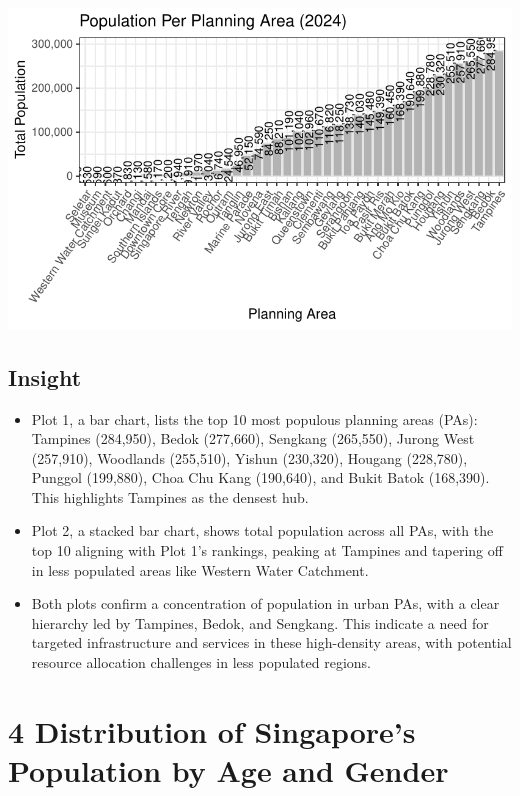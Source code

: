\documentclass[
  letterpaper,
  DIV=11,
  numbers=noendperiod]{scrartcl}
\begin{document}
\includegraphics{Take-home_Ex01_files/figure-pdf/unnamed-chunk-8-1.pdf}

\subsection{Insight}\label{insight}

\begin{itemize}
\item
  Plot 1, a bar chart, lists the top 10 most populous planning areas
  (PAs): Tampines (284,950), Bedok (277,660), Sengkang (265,550), Jurong
  West (257,910), Woodlands (255,510), Yishun (230,320), Hougang
  (228,780), Punggol (199,880), Choa Chu Kang (190,640), and Bukit Batok
  (168,390). This highlights Tampines as the densest hub.
\item
  Plot 2, a stacked bar chart, shows total population across all PAs,
  with the top 10 aligning with Plot 1's rankings, peaking at Tampines
  and tapering off in less populated areas like Western Water Catchment.
\item
  Both plots confirm a concentration of population in urban PAs, with a
  clear hierarchy led by Tampines, Bedok, and Sengkang. This indicate a
  need for targeted infrastructure and services in these high-density
  areas, with potential resource allocation challenges in less populated
  regions.
\end{itemize}

\section{4 Distribution of Singapore's Population by Age and
Gender}\label{distribution-of-singapores-population-by-age-and-gender}
\end{document}
